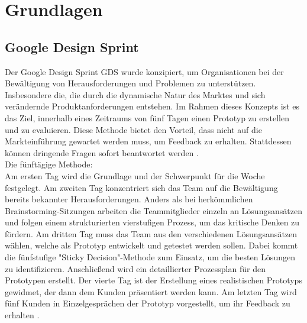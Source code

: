 \chapter{Grundlagen}

\section{Google Design Sprint}
Der Google Design Sprint \ac{GDS} wurde konzipiert, um Organisationen bei der Bewältigung von Herausforderungen und Problemen zu unterstützen. 
Insbesondere die, die durch die dynamische Natur des Marktes und sich verändernde Produktanforderungen entstehen. 
Im Rahmen dieses Konzepts ist es das Ziel, innerhalb eines Zeitraums von fünf Tagen einen Prototyp zu erstellen und zu evaluieren. 
Diese Methode bietet den Vorteil, dass nicht auf die Markteinführung gewartet werden muss, um Feedback zu erhalten. Stattdessen können dringende Fragen sofort beantwortet werden \cite[vgl.][S.98 f.]{Design_Sprint}.\\
Die fünftägige Methode:\\
Am ersten Tag wird die Grundlage und der Schwerpunkt für die Woche festgelegt. 
Am zweiten Tag konzentriert sich das Team auf die Bewältigung bereits bekannter Herausforderungen. Anders als bei herkömmlichen Brainstorming-Sitzungen arbeiten die Teammitglieder einzeln an Lösungsansätzen und folgen einem strukturierten vierstufigen Prozess, um das kritische Denken zu fördern.
Am dritten Tag muss das Team aus den verschiedenen Lösungsansätzen wählen, welche als Prototyp entwickelt und getestet werden sollen. Dabei kommt die fünfstufige "Sticky Decision"-Methode zum Einsatz, um die besten Lösungen zu identifizieren. Anschließend wird ein detaillierter Prozessplan für den Prototypen erstellt. 
Der vierte Tag ist der Erstellung eines realistischen Prototyps gewidmet, der dann dem Kunden präsentiert werden kann. 
Am letzten Tag wird fünf Kunden in Einzelgesprächen der Prototyp vorgestellt, um ihr Feedback zu erhalten \cite[vgl.][S.99]{Design_Sprint}.